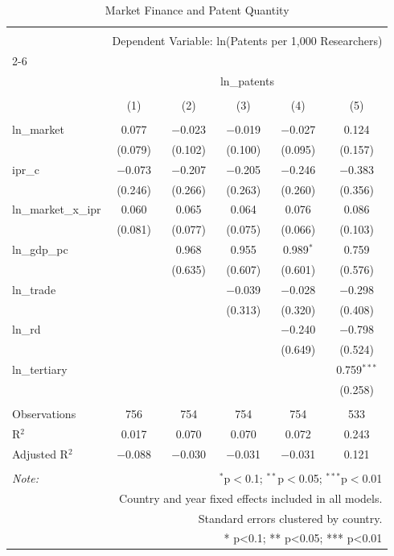
\begin{table}[!htbp] \centering 
  \caption{Market Finance and Patent Quantity} 
  \label{} 
\begin{tabular}{@{\extracolsep{5pt}}lccccc} 
\\[-1.8ex]\hline 
\hline \\[-1.8ex] 
 & \multicolumn{5}{c}{Dependent Variable: ln(Patents per 1,000 Researchers)} \\ 
\cline{2-6} 
\\[-1.8ex] & \multicolumn{5}{c}{ln\_patents} \\ 
\\[-1.8ex] & (1) & (2) & (3) & (4) & (5)\\ 
\hline \\[-1.8ex] 
 ln\_market & 0.077 & $-$0.023 & $-$0.019 & $-$0.027 & 0.124 \\ 
  & (0.079) & (0.102) & (0.100) & (0.095) & (0.157) \\ 
  ipr\_c & $-$0.073 & $-$0.207 & $-$0.205 & $-$0.246 & $-$0.383 \\ 
  & (0.246) & (0.266) & (0.263) & (0.260) & (0.356) \\ 
  ln\_market\_x\_ipr & 0.060 & 0.065 & 0.064 & 0.076 & 0.086 \\ 
  & (0.081) & (0.077) & (0.075) & (0.066) & (0.103) \\ 
  ln\_gdp\_pc &  & 0.968 & 0.955 & 0.989$^{*}$ & 0.759 \\ 
  &  & (0.635) & (0.607) & (0.601) & (0.576) \\ 
  ln\_trade &  &  & $-$0.039 & $-$0.028 & $-$0.298 \\ 
  &  &  & (0.313) & (0.320) & (0.408) \\ 
  ln\_rd &  &  &  & $-$0.240 & $-$0.798 \\ 
  &  &  &  & (0.649) & (0.524) \\ 
  ln\_tertiary &  &  &  &  & 0.759$^{***}$ \\ 
  &  &  &  &  & (0.258) \\ 
 \hline \\[-1.8ex] 
Observations & 756 & 754 & 754 & 754 & 533 \\ 
R$^{2}$ & 0.017 & 0.070 & 0.070 & 0.072 & 0.243 \\ 
Adjusted R$^{2}$ & $-$0.088 & $-$0.030 & $-$0.031 & $-$0.031 & 0.121 \\ 
\hline 
\hline \\[-1.8ex] 
\textit{Note:}  & \multicolumn{5}{r}{$^{*}$p$<$0.1; $^{**}$p$<$0.05; $^{***}$p$<$0.01} \\ 
 & \multicolumn{5}{r}{Country and year fixed effects included in all models.} \\ 
 & \multicolumn{5}{r}{Standard errors clustered by country.} \\ 
 & \multicolumn{5}{r}{* p<0.1; ** p<0.05; *** p<0.01} \\ 
\end{tabular} 
\end{table} 
